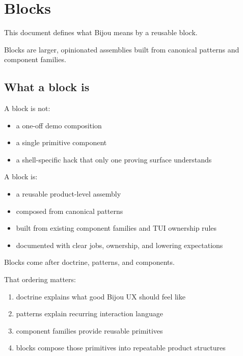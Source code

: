 \chapter{Blocks}\label{record-018}

\smallskip

This document defines what Bijou means by a reusable block.

Blocks are larger, opinionated assemblies built from canonical patterns and component families.

\section{What a block is}\label{record-018-what-a-block-is}

A block is not:

\begin{itemize}
\tightlist
\item
  a one-off demo composition
\item
  a single primitive component
\item
  a shell-specific hack that only one proving surface understands
\end{itemize}

A block is:

\begin{itemize}
\tightlist
\item
  a reusable product-level assembly
\item
  composed from canonical patterns
\item
  built from existing component families and TUI ownership rules
\item
  documented with clear jobs, ownership, and lowering expectations
\end{itemize}

Blocks come after doctrine, patterns, and components.

That ordering matters:

\begin{enumerate}
\def\labelenumi{\arabic{enumi}.}
\tightlist
\item
  doctrine explains what good Bijou UX should feel like
\item
  patterns explain recurring interaction language
\item
  component families provide reusable primitives
\item
  blocks compose those primitives into repeatable product structures
\end{enumerate}


